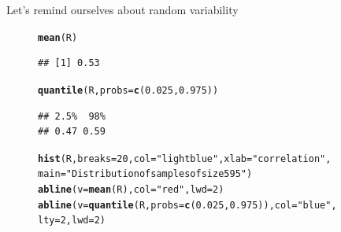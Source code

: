 \documentclass[10pt,handout]{beamer}\usepackage[]{graphicx}\usepackage[]{color}
\makeatletter
\newcommand{\hlnum}[1]{\textcolor[rgb]{0.686,0.059,0.569}{#1}}%
\newcommand{\hlstr}[1]{\textcolor[rgb]{0.192,0.494,0.8}{#1}}%
\newcommand{\hlstd}[1]{\textcolor[rgb]{0.345,0.345,0.345}{#1}}%
\newcommand{\hlkwc}[1]{\textcolor[rgb]{0.333,0.667,0.333}{#1}}%
\newcommand{\hlkwd}[1]{\textcolor[rgb]{0.737,0.353,0.396}{\textbf{#1}}}%
\newenvironment{kframe}{%
 \def\at@end@of@kframe{}%
 \ifinner\ifhmode%
  \def\at@end@of@kframe{\end{minipage}}%
  \begin{minipage}{\columnwidth}%
 \fi\fi%
 \def\FrameCommand##1{\hskip\@totalleftmargin \hskip-\fboxsep
 \colorbox{shadecolor}{##1}\hskip-\fboxsep
     \hskip-\linewidth \hskip-\@totalleftmargin \hskip\columnwidth}%
 \MakeFramed {\advance\hsize-\width
   \@totalleftmargin\z@ \linewidth\hsize
   \@setminipage}}%
 {\par\unskip\endMakeFramed%
 \at@end@of@kframe}
\newenvironment{knitrout}{}{} %
\makeatother
\begin{document}
\begin{frame}[fragile]{Let's remind ourselves about random variability}
\begin{figure}
	\begin{minipage}[h]{0.30\linewidth}
\begin{knitrout}\tiny
{}\color{fgcolor}\begin{kframe}
\begin{alltt}
\hlkwd{mean}\hlstd{(R)}
\end{alltt}
\begin{verbatim}
## [1] 0.53
\end{verbatim}
\begin{alltt}
\hlkwd{quantile}\hlstd{(R,} \hlkwc{probs} \hlstd{=} \hlkwd{c}\hlstd{(}\hlnum{0.025}\hlstd{,} \hlnum{0.975}\hlstd{))}
\end{alltt}
\begin{verbatim}
## 2.5%  98% 
## 0.47 0.59
\end{verbatim}
\end{kframe}
\end{knitrout}
	\end{minipage}
	\hspace{0.4cm}
	\begin{minipage}[h]{0.59\linewidth}
\begin{knitrout}\tiny
{}\color{fgcolor}\begin{kframe}
\begin{alltt}
\hlkwd{hist}\hlstd{(R,} \hlkwc{breaks} \hlstd{=} \hlnum{20}\hlstd{,} \hlkwc{col} \hlstd{=} \hlstr{"lightblue"}\hlstd{,} \hlkwc{xlab} \hlstd{=} \hlstr{"correlation"}\hlstd{,}
     \hlkwc{main} \hlstd{=} \hlstr{"Distribution of samples of size 595"}\hlstd{)}
\hlkwd{abline}\hlstd{(}\hlkwc{v} \hlstd{=} \hlkwd{mean}\hlstd{(R),} \hlkwc{col} \hlstd{=} \hlstr{"red"}\hlstd{,} \hlkwc{lwd} \hlstd{=} \hlnum{2}\hlstd{)}
\hlkwd{abline}\hlstd{(}\hlkwc{v} \hlstd{=} \hlkwd{quantile}\hlstd{(R,} \hlkwc{probs} \hlstd{=} \hlkwd{c}\hlstd{(}\hlnum{0.025}\hlstd{,} \hlnum{0.975}\hlstd{)),} \hlkwc{col} \hlstd{=} \hlstr{"blue"}\hlstd{,}
       \hlkwc{lty} \hlstd{=} \hlnum{2}\hlstd{,} \hlkwc{lwd} \hlstd{=} \hlnum{2}\hlstd{)}
\end{alltt}
\end{kframe}


\end{knitrout}
\end{minipage}
\end{figure}
\end{frame}
\end{document}
